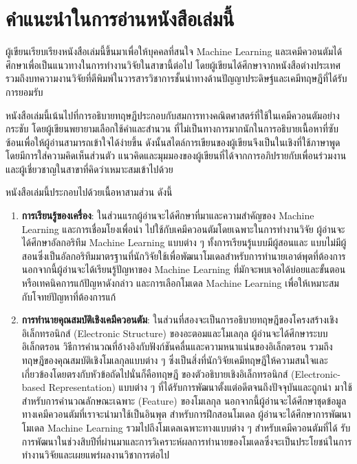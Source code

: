 

{

\chapter*{\centering คำแนะนำในการอ่านหนังสือเล่มนี้}

ผู้เขียนเรียบเรียงหนังสือเล่มนี้ขึ้นมาเพื่อให้บุคคลที่สนใจ Machine Learning และเคมีควอนตัมได้ศึกษาเพื่อเป็นแนวทางในการทำงานวิจัยในสาขานี้ต่อไป 
โดยผู้เขียนได้ศึกษาจากหนังสือต่างประเทศรวมถึงบทความงานวิจัยที่ตีพิมพ์ในวารสารวิชาการชั้นนำทางด้านปัญญาประดิษฐ์และเคมีทฤษฎีที่ได้รับการยอมรับ

หนังสือเล่มนี้เน้นไปที่การอธิบายทฤษฏีประกอบกับสมการทางคณิตศาสตร์ที่ใช้ในเคมีควอนตัมอย่างกระชับ โดยผู้เขียนพยายามเลือกใช้คำและสำนวน%
ที่ไม่เป็นทางการมากนักในการอธิบายเนื้อหาที่ซับซ้อนเพื่อให้ผู้อ่านสามารถเข้าใจได้ง่ายขึ้น ดังนั้นสไตล์การเขียนของผู้เขียนจึงเป็นในเชิงที่ใช้ภาษาพูด 
โดยมีการใส่ความคิดเห็นส่วนตัว แนวคิดและมุมมองของผู้เขียนที่ได้จากการอภิปรายกับเพื่อนร่วมงานและผู้เชี่ยวชาญในสาขาที่คิดว่าเหมาะสมเข้าไปด้วย

หนังสือเล่มนี้ประกอบไปด้วยเนื้อหาสามส่วน ดังนี้ 
%
\begin{enumerate}[topsep=0pt]
    \item \textbf{การเรียนรู้ของเครื่อง}: ในส่วนแรกผู้อ่านจะได้ศึกษาที่มาและความสำคัญของ Machine Learning และการเชื่อมโยงเพื่อนำ%
    ไปใช้กับเคมีควอนตัมโดยเฉพาะในการทำงานวิจัย ผู้อ่านจะได้ศึกษาอัลกอริทึม Machine Learning แบบต่าง ๆ ทั้งการเรียนรู้แบบมีผู้สอนและ%
    แบบไม่มีผู้สอนซึ่งเป็นอัลกอริทึมมาตรฐานที่นักวิจัยใช้เพื่อพัฒนาโมเดลสำหรับการทำนายเอาต์พุตที่ต้องการ นอกจากนี้ผู้อ่านจะได้เรียนรู้ปัญหาของ%
    Machine Learning ที่มักจะพบเจอได้บ่อยและขั้นตอนหรือเทคนิคการแก้ปัญหาดังกล่าว และการเลือกโมเดล Machine Learning เพื่อให้เหมาะสม%
    กับโจทย์ปัญหาที่ต้องการแก้
    
    \item \textbf{การทำนายคุณสมบัติเชิงเคมีควอนตัม}: ในส่วนที่สองจะเป็นการอธิบายทฤษฎีของโครงสร้างเชิงอิเล็กทรอนิกส์ (Electronic 
    Structure) ของอะตอมและโมเลกุล ผู้อ่านจะได้ศึกษาระบบอิเล็กตรอน วิธีการคำนวณที่อ้างอิงกับฟังก์ชันคลื่นและความหนาแน่นของอิเล็กตรอน 
    รวมถึงทฤษฎีของคุณสมบัติเชิงโมเลกุลแบบต่าง ๆ ซึ่งเป็นสิ่งที่นักวิจัยเคมีทฤษฎีให้ความสนใจและเกี่ยวข้องโดยตรงกับหัวข้อถัดไปนั่นก็คือทฤษฎี%
    ของตัวอธิบายเชิงอิเล็กทรอนิกส์ (Electronic-based Representation) แบบต่าง ๆ ที่ได้รับการพัฒนาตั้งแต่อดีตจนถึงปัจจุบันและถูกนำ%
    มาใช้สำหรับการคำนวณลักษณะเฉพาะ (Feature) ของโมเลกุล นอกจากนี้ผู้อ่านจะได้ศึกษาชุดข้อมูลทางเคมีควอนตัมที่เราจะนำมาใช้เป็นอินพุต%
    สำหรับการฝึกสอนโมเดล ผู้อ่านจะได้ศึกษาการพัฒนาโมเดล Machine Learning รวมไปถึงโมเดลเฉพาะทางแบบต่าง ๆ สำหรับเคมีควอนตัมที่ได้%
    รับการพัฒนาในช่วงสิบปีที่ผ่านมาและการวิเคราะห์ผลการทำนายของโมเดลซึ่งจะเป็นประโยชน์ในการทำงานวิจัยและเผยแพร่ผลงานวิชาการต่อไป


\end{enumerate}}
